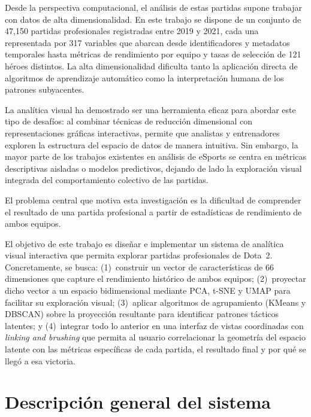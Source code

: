 \documentclass[conference]{IEEEtran}
\begin{document}
Desde la perspectiva computacional, el análisis de estas partidas supone trabajar con datos de alta dimensionalidad. En este trabajo se dispone de un conjunto de 47{,}150 partidas profesionales registradas entre 2019 y 2021, cada una representada por 317 variables que abarcan desde identificadores y metadatos temporales hasta métricas de rendimiento por equipo y tasas de selección de 121 héroes distintos. La alta dimensionalidad dificulta tanto la aplicación directa de algoritmos de aprendizaje automático como la interpretación humana de los patrones subyacentes.

La analítica visual ha demostrado ser una herramienta eficaz para abordar este tipo de desafíos: al combinar técnicas de reducción dimensional con representaciones gráficas interactivas, permite que analistas y entrenadores exploren la estructura del espacio de datos de manera intuitiva. Sin embargo, la mayor parte de los trabajos existentes en análisis de eSports se centra en métricas descriptivas aisladas o modelos predictivos, dejando de lado la exploración visual integrada del comportamiento colectivo de las partidas.

El problema central que motiva esta investigación es la dificultad de comprender el resultado de una partida profesional a partir de estadísticas de rendimiento de ambos equipos.

El objetivo de este trabajo es diseñar e implementar un sistema de analítica visual interactiva que permita explorar partidas profesionales de Dota~2. Concretamente, se busca: (1)~construir un vector de características de 66 dimensiones que capture el rendimiento histórico de ambos equipos; (2)~proyectar dicho vector a un espacio bidimensional mediante PCA, t-SNE y UMAP para facilitar su exploración visual; (3)~aplicar algoritmos de agrupamiento (KMeans y DBSCAN) sobre la proyección resultante para identificar patrones tácticos latentes; y (4)~integrar todo lo anterior en una interfaz de vistas coordinadas con \textit{linking and brushing} que permita al usuario correlacionar la geometría del espacio latente con las métricas específicas de cada partida, el resultado final y por qué se llegó a esa victoria.

\section{Descripción general del sistema}
\end{document}
